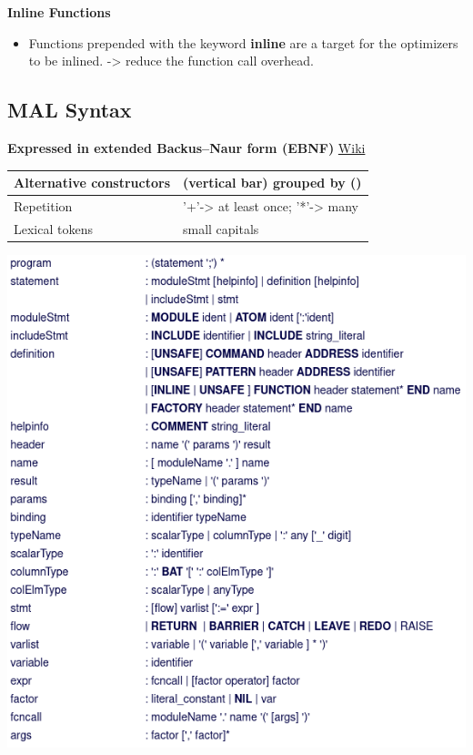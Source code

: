 \documentclass[11pt]{article}
\begin{document}
\textbf{Inline Functions}
\begin{itemize}
\item Functions prepended with the keyword \textbf{inline} are a target for the optimizers to be inlined. -> reduce the function call overhead.
\end{itemize}

\subsection{MAL Syntax}
\label{sec:org46e37a4}

\textbf{Expressed in extended Backus–Naur form (EBNF)} \href{https://en.wikipedia.org/wiki/Extended\_Backus\%E2\%80\%93Naur\_form}{Wiki}

\begin{center}
\begin{tabular}{ll}
\hline
Alternative constructors & (vertical bar) grouped by ()\\
\hline
Repetition & '+'-> at least once; '*'-> many\\
\hline
Lexical tokens & small capitals\\
\hline
\end{tabular}
\end{center}

\begin{center}
\includegraphics[width=.9\linewidth]{./Pictures/syntax.png}
\end{center}
\end{document}
